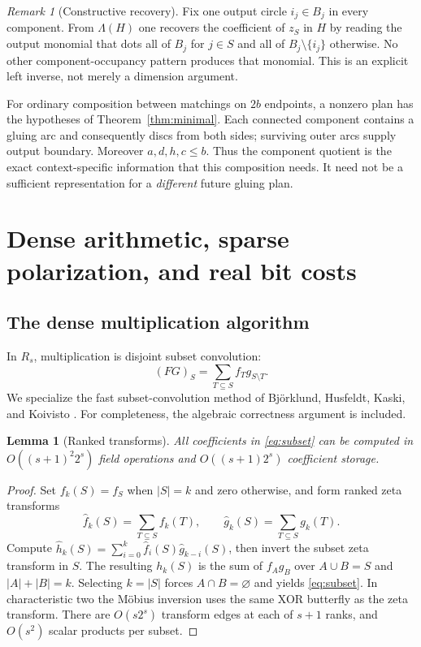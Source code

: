 \documentclass[11pt]{article}
\newtheorem{lemma}[theorem]{Lemma}
\theoremstyle{definition}\newtheorem{definition}[theorem]{Definition}
\theoremstyle{remark}\newtheorem{remark}[theorem]{Remark}
\begin{document}
\begin{remark}[Constructive recovery]
Fix one output circle $i_j\in B_j$ in every component. From $\Lambda(H)$ one recovers the coefficient of $z_S$ in $H$ by reading the output monomial that dots all of $B_j$ for $j\in S$ and all of $B_j\setminus\{i_j\}$ otherwise. No other component-occupancy pattern produces that monomial. This is an explicit left inverse, not merely a dimension argument.
\end{remark}

For ordinary composition between matchings on $2b$ endpoints, a nonzero plan has the hypotheses of Theorem~\ref{thm:minimal}. Each connected component contains a gluing arc and consequently discs from both sides; surviving outer arcs supply output boundary. Moreover $a,d,h,c\leq b$. Thus the component quotient is the exact context-specific information that this composition needs. It need not be a sufficient representation for a \emph{different} future gluing plan.

\section{Dense arithmetic, sparse polarization, and real bit costs}
\label{sec:arithmetic}
\subsection{The dense multiplication algorithm}
In $R_s$, multiplication is disjoint subset convolution:
\begin{equation}\label{eq:subset}
 (FG)_S=\sum_{T\subseteq S}f_Tg_{S\setminus T}.
\end{equation}
We specialize the fast subset-convolution method of Bj\"orklund, Husfeldt, Kaski, and Koivisto \cite{bhkk}. For completeness, the algebraic correctness argument is included.

\begin{lemma}[Ranked transforms]\label{lem:subset}
All coefficients in \eqref{eq:subset} can be computed in $O((s+1)^2 2^s)$ field operations and $O((s+1)2^s)$ coefficient storage.
\end{lemma}
\begin{proof}
Set $f_k(S)=f_S$ when $|S|=k$ and zero otherwise, and form ranked zeta transforms
\[
 \widehat f_k(S)=\sum_{T\subseteq S} f_k(T),\qquad
 \widehat g_k(S)=\sum_{T\subseteq S} g_k(T).
\]
Compute $\widehat h_k(S)=\sum_{i=0}^k\widehat f_i(S)\widehat g_{k-i}(S)$, then invert the subset zeta transform in $S$. The resulting $h_k(S)$ is the sum of $f_Ag_B$ over $A\cup B=S$ and $|A|+|B|=k$. Selecting $k=|S|$ forces $A\cap B=\varnothing$ and yields \eqref{eq:subset}. In characteristic two the M\"obius inversion uses the same XOR butterfly as the zeta transform. There are $O(s2^s)$ transform edges at each of $s+1$ ranks, and $O(s^2)$ scalar products per subset.
\end{proof}
\end{document}
